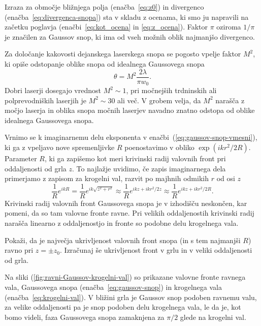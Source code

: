 Izraza za območje bližnjega polja (enačba~\ref{eq:z0}) in divergenco 
(enačba~\ref{eq:divergenca-snopa}) sta v skladu z ocenama, ki smo ju 
napravili na začetku poglavja (enačbi~\ref{eq:kot_ocena} in \ref{eq:z_ocena}). Faktor
$\pi$ oziroma $1/\pi$ je značilen za Gaussov snop, ki ima od vseh možnih oblik 
najmanjšo divergenco. 

\begin{remark}
Za določanje kakovosti dejanskega laserskega snopa se pogosto vpelje faktor $M^2$,
ki opiše odstopanje oblike snopa od idealnega Gaussovega snopa 
\begin{equation}
\theta = M^2 \frac{2\lambda}{\pi w_{0}}.
\label{faktorM}
\end{equation}
Dobri laserji dosegajo vrednost $M^2 \sim 1$,
pri močnejših trdninskih ali polprevodniških laserjih je $M^2 \sim 30$ ali več. 
V grobem velja, da $M^2$ narašča z močjo laserja in oblika snopa močnih laserjev navadno znatno
odstopa od oblike idealnega Gaussovega snopa.  
\end{remark}

Vrnimo se k imaginarnemu delu eksponenta v enačbi~(\ref{eq:gaussov-snop-vmesni}), ki ga
z vpeljavo nove spremenljivke $R$ poenostavimo v obliko $\exp(ikr^2/2R)$. Parameter $R$, ki 
ga zapišemo kot 
meri krivinski radij valovnih front 
pri oddaljenosti od grla $z$. To najlažje
uvidimo, če zapis imaginarnega dela primerjamo z zapisom za krogelni val, razvit 
po majhnih odmikih $r$ od osi
$z$
\begin{equation}
\frac{1}{R}e^{ikR}=\frac{1}{R}e^{ik\sqrt{z^{2}+r^{2}}}\approx \frac{1}{R}e^{ikz+ikr^{2}/2z} \approx \frac{1}{R}e^{ikz+ikr^{2}/2R}.
\label{eq:krogelni-val}
\end{equation}
Krivinski radij valovnih front Gaussovega snopa je v izhodišču neskončen, kar pomeni, da so tam valovne fronte 
ravne. Pri velikih oddaljenostih krivinski radij narašča linearno z oddaljenostjo in fronte
so podobne delu krogelnega vala. 

\begin{definition}
\label{naloga-ukrivljenost-snopa}
Pokaži, da je največja ukrivljenost valovnih front snopa (in s tem najmanjši $R$) ravno pri $z=\pm z_{0}$.
Izračunaj še ukrivljenost front v grlu in v veliki oddaljenosti od grla.
\end{definition}

Na sliki (\ref{fig:ravni-Gaussov-krogelni-val}) 
so prikazane valovne fronte ravnega vala, 
Gaussovega snopa (enačba~\ref{eq:gaussov-snop}) 
in krogelnega vala (enačba~\ref{eq:krogelni-val}). V bližini grla je
Gaussov snop podoben ravnemu valu, za velike oddaljenosti pa je snop 
podoben delu krogelnega vala, le da je, kot bomo videli, faza Gaussovega snopa 
zamaknjena za $\pi/2$ glede na krogelni val. 

